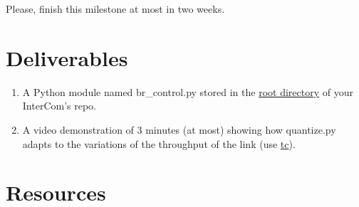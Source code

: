 Please, finish this milestone at most in two weeks.

\section{Deliverables}

\begin{enumerate}
  \item A Python module named br\_control.py stored in
    the \href{https://github.com/Tecnologias-multimedia/intercom}{root
    directory} of your InterCom's repo.  \item A video demonstration
    of 3 minutes (at most) showing how quantize.py adapts to the
    variations of the throughput of the link
    (use \href{https://man7.org/linux/man-pages/man8/tc.8.html}{tc}).
\end{enumerate}

\section{Resources}


